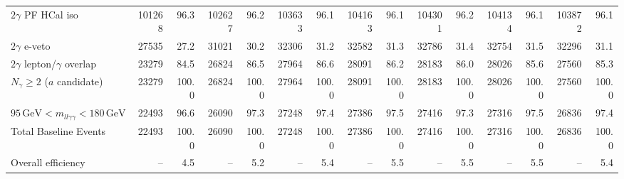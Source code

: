 \begin{table}[htbp]
{\begin{tabular}{lrrrrrrrrrrrrrr}
$2\gamma$ PF HCal iso & 101268 & 96.3 & 102627 & 96.2 & 103633 & 96.1 & 104163 & 96.1 & 104301 & 96.2 & 104134 & 96.1 & 103872 & 96.1 \\
$2\gamma$ e-veto & 27535 & 27.2 & 31021 & 30.2 & 32306 & 31.2 & 32582 & 31.3 & 32786 & 31.4 & 32754 & 31.5 & 32296 & 31.1 \\
$2\gamma$ lepton/$\gamma$ overlap & 23279 & 84.5 & 26824 & 86.5 & 27964 & 86.6 & 28091 & 86.2 & 28183 & 86.0 & 28026 & 85.6 & 27560 & 85.3 \\
$N_{\gamma}\geq 2$ ($a$ candidate) & 23279 & 100.0 & 26824 & 100.0 & 27964 & 100.0 & 28091 & 100.0 & 28183 & 100.0 & 28026 & 100.0 & 27560 & 100.0 \\
$95\,\mathrm{GeV} < m_{ll\gamma\gamma} < 180\,\mathrm{GeV}$ & 22493 & 96.6 & 26090 & 97.3 & 27248 & 97.4 & 27386 & 97.5 & 27416 & 97.3 & 27316 & 97.5 & 26836 & 97.4 \\
Total Baseline Events & 22493 & 100.0 & 26090 & 100.0 & 27248 & 100.0 & 27386 & 100.0 & 27416 & 100.0 & 27316 & 100.0 & 26836 & 100.0 \\
\hline
Overall efficiency & -- & 4.5 & -- & 5.2 & -- & 5.4 & -- & 5.5 & -- & 5.5 & -- & 5.5 & -- & 5.4 \\
\hline
\end{tabular}%
}
\end{table}

